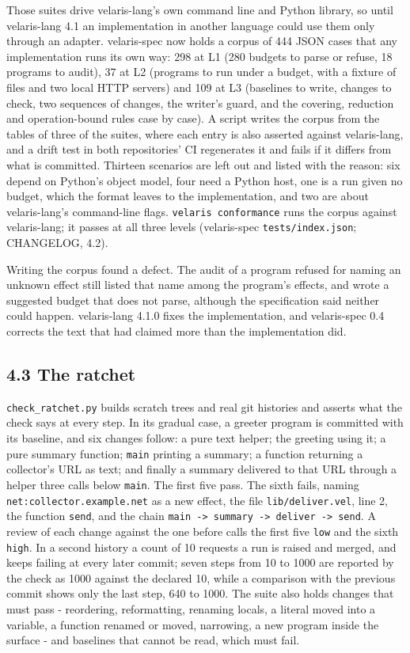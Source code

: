\documentclass[
]{article}
\begin{document}
Those suites drive velaris-lang's own command line and Python library,
so until velaris-lang 4.1 an implementation in another language could
use them only through an adapter. velaris-spec now holds a corpus of 444
JSON cases that any implementation runs its own way: 298 at L1 (280
budgets to parse or refuse, 18 programs to audit), 37 at L2 (programs to
run under a budget, with a fixture of files and two local HTTP servers)
and 109 at L3 (baselines to write, changes to check, two sequences of
changes, the writer's guard, and the covering, reduction and
operation-bound rules case by case). A script writes the corpus from the
tables of three of the suites, where each entry is also asserted against
velaris-lang, and a drift test in both repositories' CI regenerates it
and fails if it differs from what is committed. Thirteen scenarios are
left out and listed with the reason: six depend on Python's object
model, four need a Python host, one is a run given no budget, which the
format leaves to the implementation, and two are about velaris-lang's
command-line flags. \texttt{velaris\ conformance} runs the corpus
against velaris-lang; it passes at all three levels (velaris-spec
\texttt{tests/index.json}; CHANGELOG, 4.2).

Writing the corpus found a defect. The audit of a program refused for
naming an unknown effect still listed that name among the program's
effects, and wrote a suggested budget that does not parse, although the
specification said neither could happen. velaris-lang 4.1.0 fixes the
implementation, and velaris-spec 0.4 corrects the text that had claimed
more than the implementation did.

\subsection{4.3 The ratchet}\label{the-ratchet-1}

\texttt{check\_ratchet.py} builds scratch trees and real git histories
and asserts what the check says at every step. In its gradual case, a
greeter program is committed with its baseline, and six changes follow:
a pure text helper; the greeting using it; a pure summary function;
\texttt{main} printing a summary; a function returning a collector's URL
as text; and finally a summary delivered to that URL through a helper
three calls below \texttt{main}. The first five pass. The sixth fails,
naming \texttt{net:collector.example.net} as a new effect, the file
\texttt{lib/deliver.vel}, line 2, the function \texttt{send}, and the
chain
\texttt{main\ -\textgreater{}\ summary\ -\textgreater{}\ deliver\ -\textgreater{}\ send}.
A review of each change against the one before calls the first five
\texttt{low} and the sixth \texttt{high}. In a second history a count of
10 requests a run is raised and merged, and keeps failing at every later
commit; seven steps from 10 to 1000 are reported by the check as 1000
against the declared 10, while a comparison with the previous commit
shows only the last step, 640 to 1000. The suite also holds changes that
must pass - reordering, reformatting, renaming locals, a literal moved
into a variable, a function renamed or moved, narrowing, a new program
inside the surface - and baselines that cannot be read, which must fail.
\end{document}
